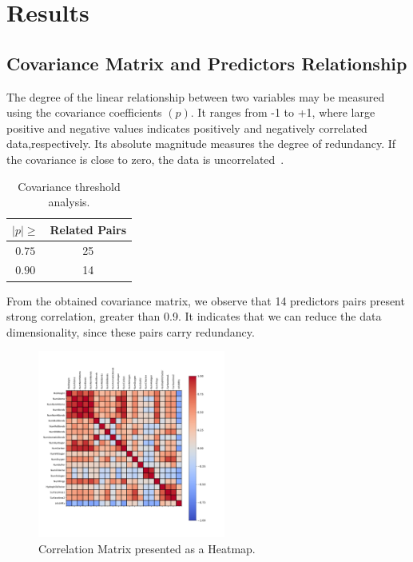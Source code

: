 
\section{Results}

\subsection{Covariance Matrix and Predictors Relationship}
The degree of the linear relationship between two variables may be measured using the covariance coefficients $(p)$. It ranges from -1 to +1, where large positive and negative values indicates positively and negatively correlated data,respectively. Its absolute magnitude measures the degree of redundancy. If the covariance is close to zero, the data is uncorrelated~\cite{Kuhn2013}.

\begin{table}[htbp]
  \caption{Covariance threshold analysis.}
  \begin{center}
  \begin{tabular}{|c|c|}
          \hline 
          $|p| \geq$ & Related Pairs\\
          \hline
          $0.75$ & 25\\
          \hline
          $0.90$ & 14 \\
          \hline
  \end{tabular}
\label{tab:Covariance}
\end{center}
\end{table}

From the obtained covariance matrix, we observe that 14 predictors pairs present strong correlation, greater than 0.9. It indicates that we can reduce the data dimensionality, since these pairs carry redundancy.

\begin{figure}[htbp!]
  \centerline{\includegraphics[width=0.55\textwidth]{../../code/hw2/figures/1-correlation_matrix.pdf}}
  \caption{Correlation Matrix presented as a Heatmap.}
  \label{fig:1-correlation_matrix}
\end{figure}

